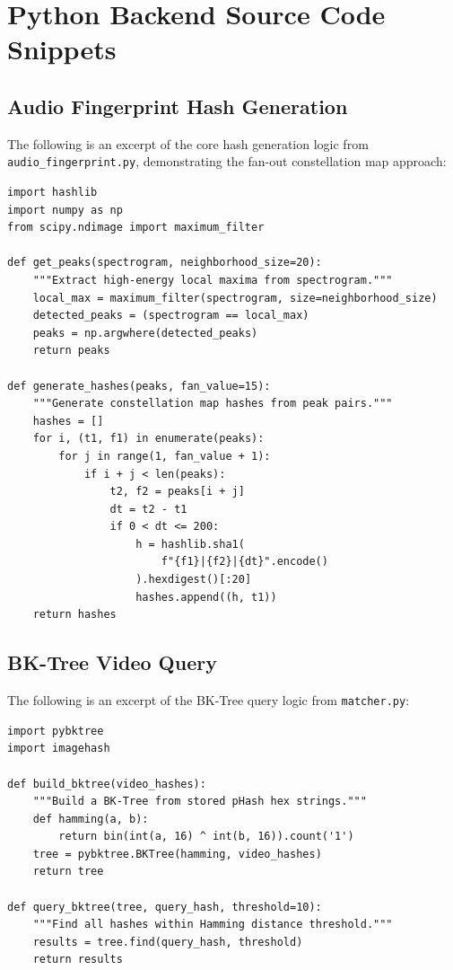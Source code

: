 \newpage
\chapter{Python Backend Source Code Snippets}

\section*{Audio Fingerprint Hash Generation}
The following is an excerpt of the core hash generation logic from \texttt{audio\_fingerprint.py}, demonstrating the fan-out constellation map approach:

\begin{verbatim}
import hashlib
import numpy as np
from scipy.ndimage import maximum_filter

def get_peaks(spectrogram, neighborhood_size=20):
    """Extract high-energy local maxima from spectrogram."""
    local_max = maximum_filter(spectrogram, size=neighborhood_size)
    detected_peaks = (spectrogram == local_max)
    peaks = np.argwhere(detected_peaks)
    return peaks

def generate_hashes(peaks, fan_value=15):
    """Generate constellation map hashes from peak pairs."""
    hashes = []
    for i, (t1, f1) in enumerate(peaks):
        for j in range(1, fan_value + 1):
            if i + j < len(peaks):
                t2, f2 = peaks[i + j]
                dt = t2 - t1
                if 0 < dt <= 200:
                    h = hashlib.sha1(
                        f"{f1}|{f2}|{dt}".encode()
                    ).hexdigest()[:20]
                    hashes.append((h, t1))
    return hashes
\end{verbatim}

\section*{BK-Tree Video Query}
The following is an excerpt of the BK-Tree query logic from \texttt{matcher.py}:

\begin{verbatim}
import pybktree
import imagehash

def build_bktree(video_hashes):
    """Build a BK-Tree from stored pHash hex strings."""
    def hamming(a, b):
        return bin(int(a, 16) ^ int(b, 16)).count('1')
    tree = pybktree.BKTree(hamming, video_hashes)
    return tree

def query_bktree(tree, query_hash, threshold=10):
    """Find all hashes within Hamming distance threshold."""
    results = tree.find(query_hash, threshold)
    return results
\end{verbatim}